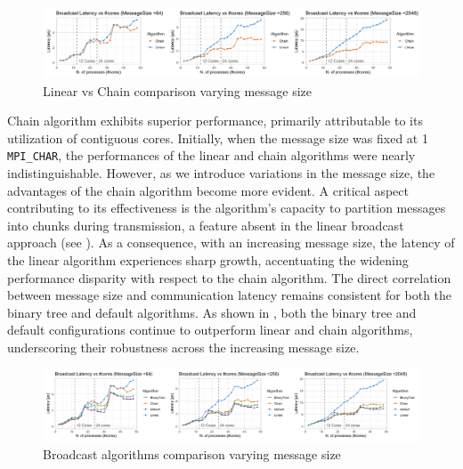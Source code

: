 \documentclass{article}
\begin{document}
\begin{figure}[htp]
    \centering
    \includegraphics[width=\textwidth]{plots/linear_vs_chain_bysize.png}
    \caption{\footnotesize Linear vs Chain comparison varying message size}
    \label{plot:linear_vs_chain_bysize}
\end{figure}
Chain algorithm exhibits superior performance, primarily attributable to its utilization of contiguous cores. Initially, when the message size was fixed at 1 \texttt{MPI\_CHAR}, the performances of the linear and chain algorithms were nearly indistinguishable. However, as we introduce variations in the message size, the advantages of the chain algorithm become more evident. A critical aspect contributing to its effectiveness is the algorithm's capacity to partition messages into chunks during transmission, a feature absent in the linear broadcast approach (see \cite{NURIYEV20221}). As a consequence, with an increasing message size, the latency of the linear algorithm experiences sharp growth, accentuating the widening performance disparity with respect to the chain algorithm. The direct correlation between message size and communication latency remains consistent for both the binary tree and default algorithms. As shown in , both the binary tree and default configurations continue to outperform linear and chain algorithms, underscoring their robustness across the increasing message size.
\begin{figure}[htp]
    \centering
    \includegraphics[width=\textwidth]{plots/algs_comparison_bysize.png}
    \caption{\footnotesize Broadcast algorithms comparison varying message size}
    \label{plot:algs_comparison_bysize}
\end{figure}
\end{document}
